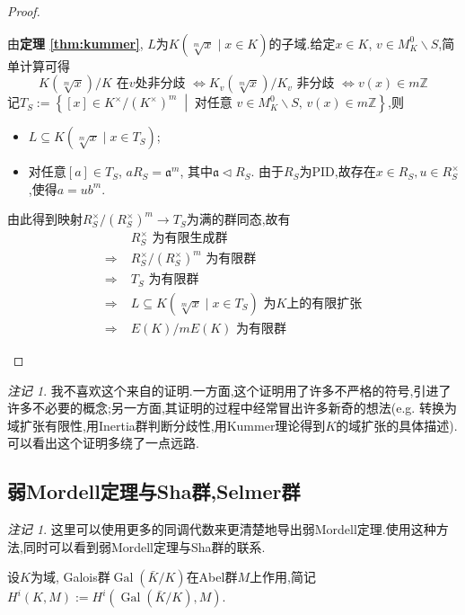 \documentclass[12pt,A4paper,oneside,reqno]{amsart}
\numberwithin{equation}{section}
\theoremstyle{definition}
\theoremstyle{plain}
\theoremstyle{plain}
\numberwithin{equation}{section}
\theoremstyle{remark}
\newtheorem{remark}[theorem]{注记}
\newcommand{\Gal}{\operatorname{Gal}}
\begin{document}
\begin{proof}
\begin{enumerate}[1.]
		由\textbf{定理 \ref{thm:kummer}}, $L$为$K(\sqrt[m]{x} \mid x \in K)$的子域.给定$x \in K$, $v \in M_K^{0} \smallsetminus S$,简单计算可得
		$$K(\sqrt[m]{x})/K \text{ 在$v$处非分歧 } \Longleftrightarrow K_v(\sqrt[m]{x})/K_v \text{ 非分歧 } \Longleftrightarrow v(x) \in m\mathbb{Z}$$
		记$T_S:=\left\{[x] \in K^{\times}/(K^{\times})^m \;\middle|\;\text{对任意 }v \in M_K^{0} \smallsetminus S,\, v(x) \in m\mathbb{Z} \right\}$,则
		\begin{itemize}
			\item $L \subseteq K(\sqrt[m]{x} \mid x \in T_S)$;
			\item 对任意$[a] \in T_S$, $aR_S=\mathfrak{a}^m$, 其中$\mathfrak{a} \vartriangleleft R_S$. 由于$R_S$为PID,故存在$x \in R_S, u \in R_S^{\times}$,使得$a=ub^m$.
		\end{itemize}
	由此得到映射$R_S^{\times}/(R_S^{\times})^m\longrightarrow T_S$为满的群同态,故有
	\begin{equation*}
	\begin{aligned}
		&R_S^{\times}\text{ 为有限生成群}\\
		\Longrightarrow\;&R_S^{\times}/(R_S^{\times})^m \text{ 为有限群}\\
		\Longrightarrow\;&T_S \text{ 为有限群}\\
		\Longrightarrow\;&L \subseteq K(\sqrt[m]{x} \mid x \in T_S) \text{ 为$K$上的有限扩张}\\
		\Longrightarrow\;&E(K)/mE(K)\text{ 为有限群}
	\end{aligned}
	\end{equation*}
	\end{enumerate}
\end{proof}
\begin{remark}
	我不喜欢这个来自\cite{tate1974the}的证明.一方面,这个证明用了许多不严格的符号,引进了许多不必要的概念;另一方面,其证明的过程中经常冒出许多新奇的想法(e.g. 转换为域扩张有限性,用Inertia群判断分歧性,用Kummer理论得到$K$的域扩张的具体描述).可以看出这个证明多绕了一点远路.
\end{remark}
\subsection{弱Mordell定理与Sha群,Selmer群}\label{subse:Step1}

\begin{remark}
	这里可以使用更多的同调代数来更清楚地导出弱Mordell定理.使用这种方法,同时可以看到弱Mordell定理与Sha群的联系.
\end{remark}
	设$K$为域, Galois群$\Gal(\bar{K}/K)$在Abel群$M$上作用,简记$H^i(K,M):=H^i(\Gal(\bar{K}/K),M)$.
	
\end{document}
